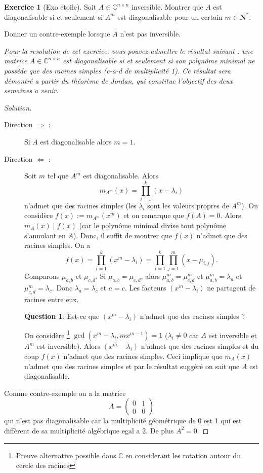 \documentclass[a4paper,12pt,french]{report}
\theoremstyle{plain}
\theoremstyle{definition}
\newtheorem*{question}{Question}
\newtheorem{exercise}{Exercice}[chapter]
\begin{document}
\begin{exercise}[Exo etoile]
Soit $A\in \mathbb{C}^{n\times n}$ inversible. Montrer que $A$ est diagonalisable si et seulement si $A^{m}$ est diagonalisable pour un certain $m\in \mathbf{N}^{*}$.

Donner un contre-exemple lorsque $A$ n'est pas inversible.

\emph{Pour la resolution de cet exercice, vous pouvez admettre le résultat suivant : une matrice $A\in \mathbb{C}^{n\times n}$ est diagonalisable si et seulement si son polynôme minimal ne possède que des racines simples (c-a-d de multiplicité 1). Ce résultat sera démontré a partir du théorème de Jordan, qui constitue l'objectif des deux semaines a venir.}
\end{exercise}
\begin{proof}[Solution]
\begin{description}
\item[Direction $\Rightarrow$ :] Si $A$ est diagonalisable alors $m=1$. 

\item[Direction $\Leftarrow$ :] Soit $m$ tel que $A^{m}$ est diagonalisable. Alors
$$
m_{A^{m}}(x)=\prod_{i=1}^{k} (x-\lambda _{i})
$$
n'admet que des racines simples (les $\lambda _{i}$ sont les valeurs propres de $A^{m}$). On considère $f(x):=m_{A^{m}}(x^{m})$ et on remarque que $f(A)=0$. Alors $m_{A}(x) \mid f(x)$ (car le polynôme minimal divise tout polynôme s'annulant en $A$). Donc, il suffit de montrer que $f(x)$ n'admet que des racines simples. On a
$$
f(x)=\prod_{i=1}^{k} (x^{m}-\lambda _{i})=\prod_{i=1}^{k}\prod_{j=1}^{m}(x-\mu _{i,j}). 
$$
Comparons $\mu _{a,b}$ et $\mu _{c,d}$. Si $\mu _{a,b}=\mu _{c,d}$, alors $\mu _{a,b}^{m}=\mu _{c,d}^{m}$ et $\mu _{a,b}^{m}=\lambda _{a}$ et $\mu _{c,d}^{m}=\lambda _{c}$. Donc $\lambda _{a}=\lambda _{c}$ et $a=c$. Les facteurs $(x^{m}-\lambda _{i})$ ne partagent de racines entre eux.
\begin{question}
Est-ce que $(x^{m}-\lambda _{i})$ n'admet que des racines simples ?
\end{question}
On considère \footnote{Preuve alternative possible dans $\mathbb{C}$ en considerant les rotation autour du cercle des racines} $\gcd(x^{m}-\lambda _{i},mx^{m-1})=1$ ($\lambda _{i}\neq0$ car $A$ est inversible et $A^{m}$ est inversible). Alors $(x^{m}-\lambda _{i})$ n'admet que des racines simples et du coup $f(x)$ n'admet que des racines simples. Ceci implique que $m_{A}(x)$ n'admet que des racines simples et par le résultat suggéré on sait que $A$ est diagonalisable.
\end{description}
Comme contre-exemple on a la matrice
$$
A=\begin{pmatrix}
0 & 1 \\
0 & 0
\end{pmatrix}
$$
qui n'est pas diagonalisable car la multiplicité géométrique de 0 est 1 qui est diffèrent de sa multiplicité algébrique egal a 2. De plus $A^{2}=0$. 
\end{proof}
\end{document}
